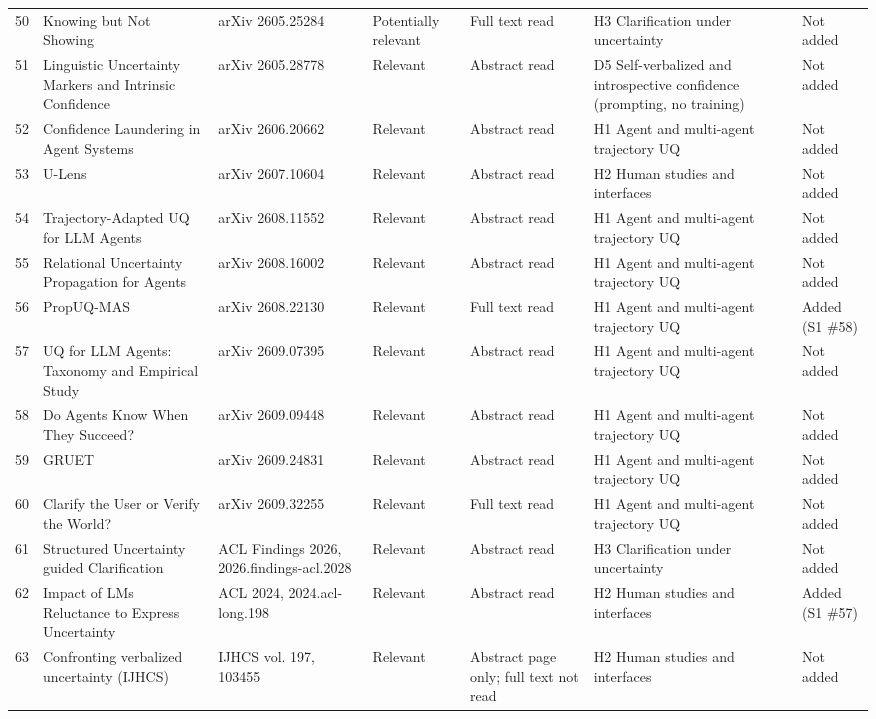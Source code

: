 \documentclass[acmsmall]{acmart}
\begin{document}
\begin{center}
\begin{longtable}{@{}r p{3.0cm} p{2.0cm} p{1.5cm} p{2.3cm} p{2.6cm} p{1.2cm}@{}}
50 & Knowing but Not Showing & arXiv 2605.25284 & Potentially relevant & Full text read & H3 Clarification under uncertainty & Not added \\
51 & Linguistic Uncertainty Markers and Intrinsic Confidence & arXiv 2605.28778 & Relevant & Abstract read & D5 Self-verbalized and introspective confidence (prompting, no training) & Not added \\
52 & Confidence Laundering in Agent Systems & arXiv 2606.20662 & Relevant & Abstract read & H1 Agent and multi-agent trajectory UQ & Not added \\
53 & U-Lens & arXiv 2607.10604 & Relevant & Abstract read & H2 Human studies and interfaces & Not added \\
54 & Trajectory-Adapted UQ for LLM Agents & arXiv 2608.11552 & Relevant & Abstract read & H1 Agent and multi-agent trajectory UQ & Not added \\
55 & Relational Uncertainty Propagation for Agents & arXiv 2608.16002 & Relevant & Abstract read & H1 Agent and multi-agent trajectory UQ & Not added \\
56 & PropUQ-MAS & arXiv 2608.22130 & Relevant & Full text read & H1 Agent and multi-agent trajectory UQ & Added (S1 \#58) \\
57 & UQ for LLM Agents: Taxonomy and Empirical Study & arXiv 2609.07395 & Relevant & Abstract read & H1 Agent and multi-agent trajectory UQ & Not added \\
58 & Do Agents Know When They Succeed? & arXiv 2609.09448 & Relevant & Abstract read & H1 Agent and multi-agent trajectory UQ & Not added \\
59 & GRUET & arXiv 2609.24831 & Relevant & Abstract read & H1 Agent and multi-agent trajectory UQ & Not added \\
60 & Clarify the User or Verify the World? & arXiv 2609.32255 & Relevant & Full text read & H1 Agent and multi-agent trajectory UQ & Not added \\
61 & Structured Uncertainty guided Clarification & ACL Findings 2026, 2026.findings-acl.2028 & Relevant & Abstract read & H3 Clarification under uncertainty & Not added \\
62 & Impact of LMs Reluctance to Express Uncertainty & ACL 2024, 2024.acl-long.198 & Relevant & Abstract read & H2 Human studies and interfaces & Added (S1 \#57) \\
63 & Confronting verbalized uncertainty (IJHCS) & IJHCS vol. 197, 103455 & Relevant & Abstract page only; full text not read & H2 Human studies and interfaces & Not added \\

\end{longtable}
\end{center}
\end{document}

